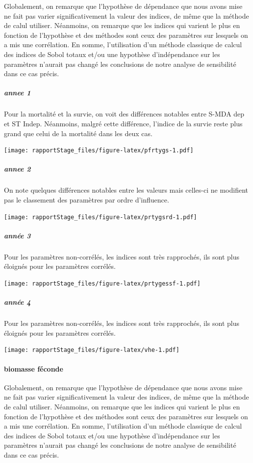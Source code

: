 \documentclass[
]{article}
\begin{document}
Globalement, on remarque que l'hypothèse de dépendance que nous avons
mise ne fait pas varier significativement la valeur des indices, de même
que la méthode de calul utiliser. Néanmoins, on remarque que les indices
qui varient le plus en fonction de l'hypothèse et des méthodes sont ceux
des paramètres sur lesquels on a mis une corrélation. En somme,
l'utilisation d'un méthode classique de calcul des indices de Sobol
totaux et/ou une hypothèse d'indépendance sur les paramètres n'aurait
pas changé les conclusions de notre analyse de sensibilité dans ce cas
précis.

\hypertarget{annee-1}{%
\subparagraph{annee 1}\label{annee-1}}

Pour la mortalité et la survie, on voit des différences notables entre
S-MDA dep et ST Indep. Néanmoins, malgré cette différence, l'indice de
la survie reste plus grand que celui de la mortalité dans les deux cas.

\texttt{[image: rapportStage\_files/figure-latex/pfrtygs-1.pdf]}

\hypertarget{annee-2}{%
\subparagraph{annee 2}\label{annee-2}}

On note quelques différences notables entre les valeurs mais celles-ci
ne modifient pas le classement des paramètres par ordre d'influence.

\texttt{[image: rapportStage\_files/figure-latex/prtygsrd-1.pdf]}

\hypertarget{annuxe9e-3}{%
\subparagraph{année 3}\label{annuxe9e-3}}

Pour les paramètres non-corrélés, les indices sont très rapprochés, ils
sont plus éloignés pour les paramètres corrélés.

\texttt{[image: rapportStage\_files/figure-latex/prtygessf-1.pdf]}

\hypertarget{annuxe9e-4}{%
\subparagraph{année 4}\label{annuxe9e-4}}

Pour les paramètres non-corrélés, les indices sont très rapprochés, ils
sont plus éloignés pour les paramètres corrélés.

\texttt{[image: rapportStage\_files/figure-latex/vhe-1.pdf]}

\hypertarget{biomasse-fuxe9conde-2}{%
\paragraph{biomasse féconde}\label{biomasse-fuxe9conde-2}}

Globalement, on remarque que l'hypothèse de dépendance que nous avons
mise ne fait pas varier significativement la valeur des indices, de même
que la méthode de calul utiliser. Néanmoins, on remarque que les indices
qui varient le plus en fonction de l'hypothèse et des méthodes sont ceux
des paramètres sur lesquels on a mis une corrélation. En somme,
l'utilisation d'un méthode classique de calcul des indices de Sobol
totaux et/ou une hypothèse d'indépendance sur les paramètres n'aurait
pas changé les conclusions de notre analyse de sensibilité dans ce cas
précis.
\end{document}
